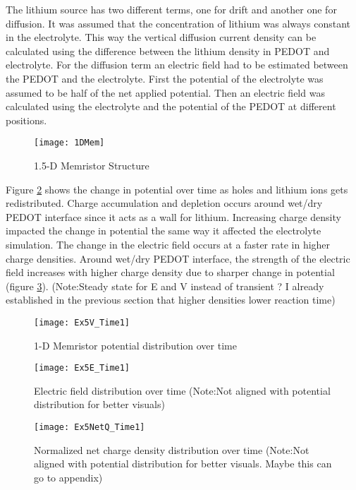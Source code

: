 The lithium source has two different terms, one for drift and another one for diffusion. It was assumed that the concentration of lithium was always constant in the electrolyte. This way the vertical diffusion current density can be calculated using the difference between the lithium density in PEDOT and electrolyte. For the diffusion term an electric field had to be estimated between the PEDOT and the electrolyte. First the potential of the electrolyte was assumed to be half of the net applied potential. Then an electric field was calculated using the electrolyte and the potential of the PEDOT at different positions.
  
\begin{figure}[!htp]
\centering
\texttt{[image: 1DMem]}
\caption{1.5-D Memristor Structure} 
\label{MemStc15}
\end{figure}

Figure \ref{MemV} shows the change in potential over time as holes and lithium ions gets redistributed. Charge accumulation and depletion occurs around wet/dry PEDOT interface since it acts as a wall for lithium. Increasing charge density impacted the change in potential the same way it affected the electrolyte simulation. The change in the electric field occurs at a faster rate in higher charge densities. Around wet/dry PEDOT interface, the strength of the electric field increases with higher charge density due to sharper change in potential (figure \ref{MemE}). (Note:Steady state for E and V instead of transient ? I already established in the previous section that higher densities lower reaction time)      

\begin{landscape}
\begin{figure}[!htp]
\centering
\texttt{[image: Ex5V\_Time1]}
\caption{1-D Memristor potential distribution over time} 
\label{MemV}
\end{figure}
\end{landscape}


\begin{landscape}
\begin{figure}[!htp]
\centering
\texttt{[image: Ex5E\_Time1]}
\caption{Electric field distribution over time (Note:Not aligned with potential distribution for better visuals) } 
\label{MemE}
\end{figure}
\end{landscape}


\begin{landscape}
\begin{figure}[!htp]
\centering
\texttt{[image: Ex5NetQ\_Time1]}
\caption{Normalized net charge density distribution over time (Note:Not aligned with potential distribution for better visuals. Maybe this can go to appendix) } 
\label{}
\end{figure}
\end{landscape}


